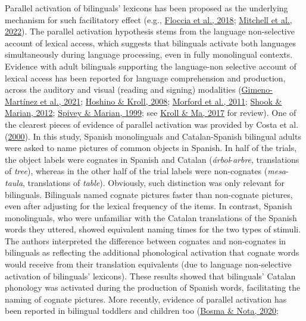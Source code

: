 \documentclass[
]{article}
\begin{document}
Parallel activation of bilinguals' lexicons has been proposed as the
underlying mechanism for such facilitatory effect (e.g.,
\protect\hyperlink{ref-floccia2018introduction}{Floccia et al., 2018};
\protect\hyperlink{ref-mitchell2022cognates}{Mitchell et al., 2022}).
The parallel activation hypothesis stems from the language non-selective
account of lexical access, which suggests that bilinguals activate both
languages simultaneously during language processing, even in fully
monolingual contexts. Evidence with adult bilinguals supporting the
language-non selective account of lexical access has been reported for
language comprehension and production, across the auditory and visual
(reading and signing) modalities
(\protect\hyperlink{ref-gimeno-martinez2021crosslinguistic}{Gimeno-Martínez
et al., 2021}; \protect\hyperlink{ref-hoshino2008cognate}{Hoshino \&
Kroll, 2008}; \protect\hyperlink{ref-morford2011when}{Morford et al.,
2011}; \protect\hyperlink{ref-shook2012bimodal}{Shook \& Marian, 2012};
\protect\hyperlink{ref-spivey1999cross}{Spivey \& Marian, 1999}; see
\protect\hyperlink{ref-kroll2017bilingual}{Kroll \& Ma, 2017} for
review). One of the clearest pieces of evidence of parallel activation
was provided by Costa et al.
(\protect\hyperlink{ref-costa2000cognate}{2000}). In this study, Spanish
monolinguals and Catalan-Spanish bilingual adults were asked to name
pictures of common objects in Spanish. In half of the trials, the object
labels were cognates in Spanish and Catalan (\emph{árbol}-\emph{arbre},
translations of \emph{tree}), whereas in the other half of the trial
labels were non-cognates (\emph{mesa}-\emph{taula}, translations of
\emph{table}). Obviously, such distinction was only relevant for
bilinguals. Bilinguals named cognate pictures faster than non-cognate
pictures, even after adjusting for the lexical frequency of the items.
In contrast, Spanish monolinguals, who were unfamiliar with the Catalan
translations of the Spanish words they uttered, showed equivalent naming
times for the two types of stimuli. The authors interpreted the
difference between cognates and non-cognates in bilinguals as reflecting
the additional phonological activation that cognate words would receive
from their translation equivalents (due to language non-selective
activation of bilinguals' lexicons). These results showed that
bilinguals' Catalan phonology was activated during the production of
Spanish words, facilitating the naming of cognate pictures. More
recently, evidence of parallel activation has been reported in bilingual
toddlers and children too
(\protect\hyperlink{ref-bosma2020cognate}{Bosma \& Nota, 2020};
\end{document}
